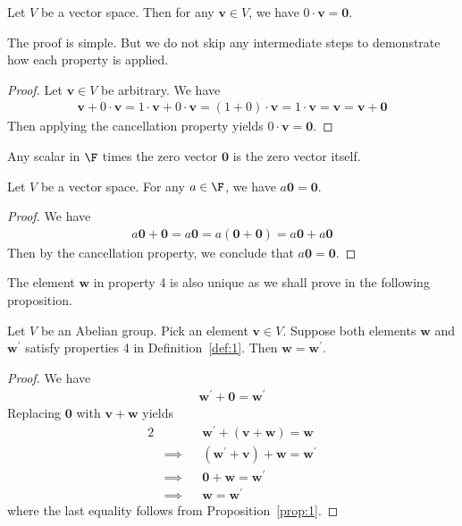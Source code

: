 \documentclass[thmcnt=section, color=cyan, 12pt]{my-elegantbook}
\begin{document}
\begin{proposition} \label{prop:1}
	Let $V$ be a vector space. Then for any $\mathbf{v} \in V$,
	we have $0 \cdot \mathbf{v} = \mathbf{0}$.
\end{proposition}


The proof is simple.
But we do not skip any intermediate steps to demonstrate
how each property is applied.

\begin{proof}
	Let $\mathbf{v} \in V$ be arbitrary. We have
	\begin{align*}
		\mathbf{v} + 0 \cdot \mathbf{v}
		= 1 \cdot \mathbf{v} + 0 \cdot \mathbf{v}
		= (1 + 0) \cdot \mathbf{v}
		= 1 \cdot \mathbf{v}
		= \mathbf{v}
		= \mathbf{v} + \mathbf{0}
	\end{align*}
	Then applying the cancellation property yields $0 \cdot \mathbf{v} = \mathbf{0}$.
\end{proof}


Any scalar in $\F$ times the zero vector $\mathbf{0}$
is the zero vector itself.

\begin{proposition}
	Let $V$ be a vector space. For any $a \in \F$,
	we have $a \mathbf{0} = \mathbf{0}$.
\end{proposition}

\begin{proof}
	We have
	\begin{align*}
		a\mathbf{0} + \mathbf{0} = a \mathbf{0} = a (\mathbf{0} + \mathbf{0}) = a \mathbf{0} + a \mathbf{0}
	\end{align*}
	Then by the cancellation property, we conclude that $a\mathbf{0} = \mathbf{0}$.
\end{proof}

The element $\mathbf{w}$ in property 4 is also unique
as we shall prove in the following proposition.

\begin{proposition}
	Let $V$ be an Abelian group.
	Pick an element $\mathbf{v} \in V$.
	Suppose both elements $\mathbf{w}$ and $\mathbf{w}^\prime$
	satisfy properties 4 in Definition~\ref{def:1}.
	Then $\mathbf{w} = \mathbf{w}^\prime$.
\end{proposition}

\begin{proof}
	We have
	\begin{align*}
		\mathbf{w}^\prime + \mathbf{0} = \mathbf{w}^\prime
	\end{align*}
	Replacing $\mathbf{0}$ with $\mathbf{v} + \mathbf{w}$ yields
	\begin{alignat*}{2}
		 &          &  & \mathbf{w}^\prime + (\mathbf{v} + \mathbf{w}) = \mathbf{w}        \\
		 & \implies &  & (\mathbf{w}^\prime + \mathbf{v}) + \mathbf{w} = \mathbf{w}^\prime \\
		 & \implies &  & \mathbf{0} + \mathbf{w} = \mathbf{w}^\prime                       \\
		 & \implies &  & \mathbf{w} = \mathbf{w}^\prime
	\end{alignat*}
	where the last equality follows from Proposition~\ref{prop:1}.
\end{proof}
\end{document}
